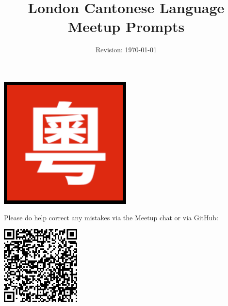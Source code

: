 \title{\vspace{-0.5cm}\large\bfseries London Cantonese Language Meetup Prompts}
\author{Revision: \today{} }
\date{}
\maketitle

\begin{center}
  \includegraphics[width=0.50\textwidth]{./assets/img/logo.png}
\end{center}

Please do help correct any mistakes via the Meetup chat or
via GitHub:

\begin{center}
  \includegraphics[width=0.30\textwidth]{./assets/img/github.png}
\end{center}



